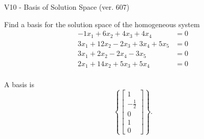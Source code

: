 \begin{exercise}
  \begin{exerciseTitle}V10 - Basis of Solution Space (ver. 607)\end{exerciseTitle}
  \begin{exerciseStatement}
    Find a basis for the solution space of the homogeneous system 
\begin{align*}
 -1 x_ 1 + 6 x_ 2 + 4 x_ 3 + 4 x_ 4 &= 0  \\ 
  3 x_ 1 + 12 x_ 2 -2 x_ 3 + 3 x_ 4 + 5 x_ 5 &= 0  \\ 
  3 x_ 1 + 2 x_ 2 -2 x_ 4 -3 x_ 5 &= 0  \\ 
  2 x_ 1 + 14 x_ 2 + 5 x_ 3 + 5 x_ 4 &= 0  \\ 
 \end{align*}


 
  \end{exerciseStatement}

  \begin{exerciseAnswer}
   A basis is   
\[\left\{\left[\begin{array}{c}
1 \\
-\frac{1}{2} \\
0 \\
1 \\
0
\end{array}\right]\right\}.\]

  


  \end{exerciseAnswer}
\end{exercise}